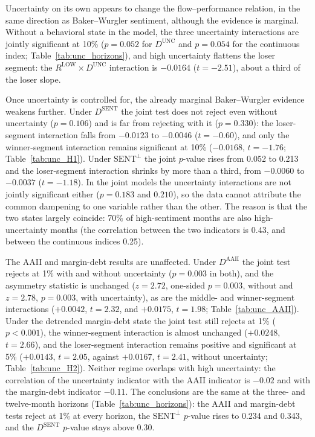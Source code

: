 \documentclass[12pt, oneside]{report}
\begin{document}


Uncertainty on its own appears to change the flow--performance
relation, in the same direction as Baker--Wurgler sentiment, although the
evidence is marginal. Without a behavioral state in the model, the three
uncertainty interactions are jointly significant at 10\% ($p = 0.052$ for $D^{\text{UNC}}$ and $p = 0.054$ for the
continuous index; Table~\ref{tab:unc_horizons}), and high uncertainty
flattens the loser segment: the $R^{\text{LOW}} \times D^{\text{UNC}}$
interaction is $-0.0164$ ($t = -2.51$), about a third of the loser
slope.

Once uncertainty is controlled for, the already marginal Baker--Wurgler
evidence weakens further. Under $D^{\text{SENT}}$ the joint test does not
reject even without uncertainty ($p = 0.106$) and is far from rejecting
with it ($p = 0.330$): the loser-segment interaction
falls from $-0.0123$ to $-0.0046$ ($t = -0.60$), and only the
winner-segment interaction remains significant at 10\% ($-0.0168$,
$t = -1.76$; Table~\ref{tab:unc_H1}). Under $\text{SENT}^{\perp}$ the
joint $p$-value rises from 0.052 to 0.213 and the loser-segment
interaction shrinks by more than a third, from $-0.0060$ to $-0.0037$
($t = -1.18$). In the joint models the uncertainty interactions are not
jointly significant either ($p = 0.183$ and $0.210$), so the data cannot
attribute the common dampening to one variable rather than the other.
The reason is that the two states largely coincide: 70\% of
high-sentiment months are also high-uncertainty months (the correlation
between the two indicators is 0.43, and between the continuous indices
0.25).

The AAII and margin-debt results are unaffected. Under $D^{\text{AAII}}$
the joint test rejects at 1\% with and without uncertainty ($p = 0.003$
in both), and the asymmetry statistic is unchanged ($z = 2.72$, one-sided $p = 0.003$, without and
$z = 2.78$, $p = 0.003$, with uncertainty), as are the middle- and
winner-segment interactions ($+0.0042$, $t = 2.32$, and $+0.0175$,
$t = 1.98$; Table~\ref{tab:unc_AAII}). Under the detrended margin-debt
state the joint test still rejects at 1\% ($p < 0.001$), the
winner-segment interaction is almost unchanged ($+0.0248$, $t = 2.66$),
and the loser-segment interaction remains positive and significant at
5\% ($+0.0143$, $t = 2.05$, against $+0.0167$, $t = 2.41$,
without uncertainty; Table~\ref{tab:unc_H2}). Neither regime overlaps
with high uncertainty: the correlation of the uncertainty indicator with
the AAII indicator is $-0.02$ and with the margin-debt indicator $-0.11$.
The conclusions are the same at the three- and twelve-month horizons
(Table~\ref{tab:unc_horizons}): the AAII and margin-debt tests reject at
1\% at every horizon, the $\text{SENT}^{\perp}$ $p$-value rises to 0.234
and 0.343, and the $D^{\text{SENT}}$ $p$-value stays above 0.30.
\end{document}
